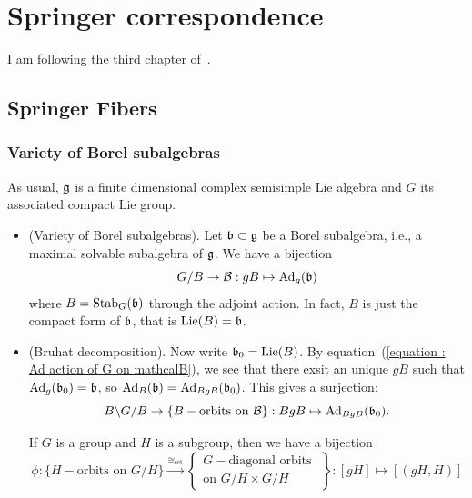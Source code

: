 \chapter{Springer correspondence}
I am following the third chapter of~\cite{chriss1997representation}. 
\section{Springer Fibers}
\subsection{Variety of Borel subalgebras}
As usual, $\mathfrak{g}$ is a finite dimensional complex semisimple Lie algebra and $G$ its associated compact 
Lie group.
\begin{itemize}
    \item(Variety of Borel subalgebras). Let $\mathfrak{b}\subset \mathfrak{g}$ be a Borel subalgebra, i.e., a maximal 
    solvable subalgebra of $\mathfrak{g}$. We have a bijection
    \begin{equation}\label{equation : Ad action of G on mathcalB}
        G/B \to \mathcal{B}: gB \mapsto \text{Ad}_g(\mathfrak{b})
    \end{equation} 
    where $B=\text{Stab}_G(\mathfrak{b})$ through the adjoint action. In fact, $B$ is just the compact form of $\mathfrak{b}$, that is 
    $\text{Lie}(B)=\mathfrak{b}$.
    \item(Bruhat decomposition). Now write $\mathfrak{b}_0=\text{Lie}(B)$. 
    By equation~(\ref{equation : Ad action of G on mathcalB}), we see that there exsit an unique 
    $gB$ such that $\text{Ad}_g(\mathfrak{b}_0)=\mathfrak{b}$, so $\text{Ad}_B(\mathfrak{b})=\text{Ad}_{BgB}(\mathfrak{b}_0)$. This gives a surjection:
    \begin{equation}\label{equation : first map}
        B\backslash G/B \rightarrow\{B-\text{orbits on }\mathcal{B}\}:BgB\mapsto \text{Ad}_{BgB}(\mathfrak{b}_0).
    \end{equation} 
    \begin{remark}
        If $G$ is a group and $H$ is a subgroup, then we have a bijection
        \begin{equation}\label{equation : second map}
            \phi:\{H-\text{orbits on }G/H\}\overset{\cong_{\text{set}}}{\rightarrow}
            \left\{\begin{matrix}G-\text{diagonal orbits }\\\text{on }G/H\times G/H\end{matrix}\right\}:
            [gH]\mapsto [(gH,H)]
        \end{equation}

\end{remark}
\end{itemize}
